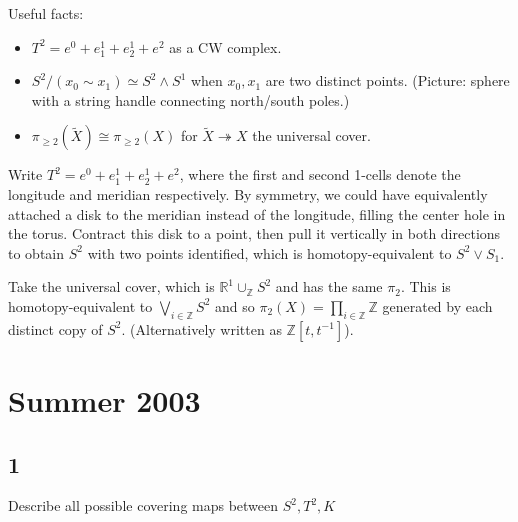 \begin{solution}

Useful facts:

\begin{itemize}
\tightlist
\item
  \(T^2 = e^0 + e^1_1 + e^1_2 + e^2\) as a CW complex.
\item
  \(S^2/(x_0 \sim x_1) \simeq S^2 \wedge S^1\) when \(x_0, x_1\) are two
  distinct points. (Picture: sphere with a string handle connecting
  north/south poles.)
\item
  \(\pi_{\geq 2}(\tilde X) \cong \pi_{\geq 2}(X)\) for
  \(\tilde X \twoheadrightarrow X\) the universal cover.
\end{itemize}

Write \(T^2 = e^0 + e^1_1 + e^1_2 + e^2\), where the first and second
1-cells denote the longitude and meridian respectively. By symmetry, we
could have equivalently attached a disk to the meridian instead of the
longitude, filling the center hole in the torus. Contract this disk to a
point, then pull it vertically in both directions to obtain \(S^2\) with
two points identified, which is homotopy-equivalent to \(S^2 \vee S_1\).

Take the universal cover, which is
\({\mathbb{R}}^1 \cup_{{\mathbb{Z}}} S^2\) and has the same \(\pi_2\).
This is homotopy-equivalent to \(\bigvee_{i\in {\mathbb{Z}}}S^2\) and so
\(\pi_2(X) = \prod_{i\in {\mathbb{Z}}} {\mathbb{Z}}\) generated by each
distinct copy of \(S^2\). (Alternatively written as
\({\mathbb{Z}}[t, t^{-1}]\)).

\end{solution}

\hypertarget{summer-2003}{%
\section{Summer 2003}\label{summer-2003}}

\hypertarget{section-5}{%
\subsection{1}\label{section-5}}

Describe all possible covering maps between \(S^2, T^2, K\)

